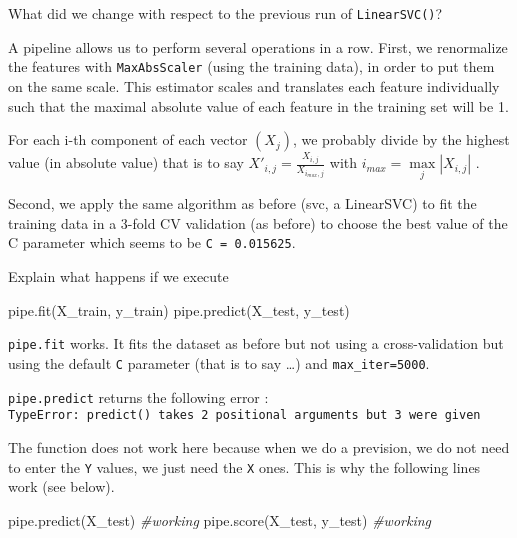\documentclass[10pt,a4paper]{article}
\newenvironment{Shaded}{\begin{snugshade}}{\end{snugshade}}
\newcommand{\CommentTok}[1]{\textcolor[rgb]{0.56,0.35,0.01}{\textit{#1}}}
\newcommand{\NormalTok}[1]{#1}
\theoremstyle{break}
\begin{document}
\begin{tcolorbox}

What did we change with respect to the previous run of \texttt{LinearSVC()}?

\end{tcolorbox}

A pipeline allows us to perform several operations in a row. First, we renormalize the features with \texttt{MaxAbsScaler} (using the training data), in order to put them on the same scale.
This estimator scales and translates each feature individually such that the maximal absolute value of each feature in the training set will be 1.

For each i-th component of each vector \((X_j)\), we probably divide by the highest value (in absolute value) that is to say \(X'_{i,j}=\frac{X_{i,j}}{X_{i_{max},j}}\) with \(i_{max}= \underset{j}{\max}|X_{i,j}|\) .

Second, we apply the same algorithm as before (svc, a LinearSVC) to fit the training data in a 3-fold CV validation (as before) to choose the best value of the C parameter which seems to be \texttt{C\ =\ 0.015625}.

\begin{tcolorbox}

Explain what happens if we execute

\begin{Shaded}
\begin{Highlighting}[]
\NormalTok{    pipe.fit(X_train, y_train)}
\NormalTok{    pipe.predict(X_test, y_test)}
\end{Highlighting}
\end{Shaded}

\end{tcolorbox}

\texttt{pipe.fit} works. It fits the dataset as before but not using a cross-validation but using the default \texttt{C} parameter (that is to say \ldots{}) and \texttt{max\_iter=5000}.

\texttt{pipe.predict} returns the following error : \texttt{TypeError:\ predict()\ takes\ 2\ positional\ arguments\ but\ 3\ were\ given}

The function does not work here because when we do a prevision, we do not need to enter the \texttt{Y} values, we just need the \texttt{X} ones.
This is why the following lines work (see below).

\begin{Shaded}
\begin{Highlighting}[]
\NormalTok{    pipe.predict(X_test) }\CommentTok{#working}
\NormalTok{    pipe.score(X_test, y_test)  }\CommentTok{#working}
\end{Highlighting}
\end{Shaded}
\end{document}
